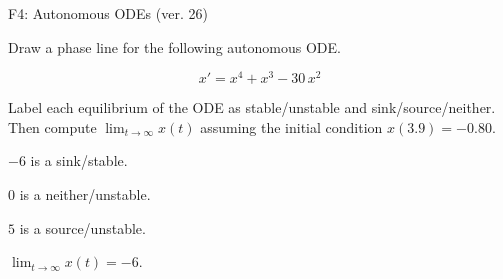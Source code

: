 \begin{exercise}
  \begin{exerciseTitle}F4: Autonomous ODEs (ver. 26)\end{exerciseTitle}
  \begin{exerciseStatement}
    

      Draw a phase line for the following 
      autonomous ODE.
    

    
\[x'= x^{4} + x^{3} - 30 \, x^{2}\]

    

      Label each equilibrium of the ODE
      as stable/unstable and sink/source/neither.
      Then compute \(\lim_{t\to\infty}x(t)\)
      assuming the initial condition
      \(x( 3.9 )= -0.80\).
    

  \end{exerciseStatement}
  \begin{exerciseAnswer}
    

      \(-6\) is a sink/stable.
      
        \(0\) is a neither/unstable.
      
      \(5\) is a source/unstable.
    

    

      \(\lim_{t\to\infty}x(t)=-6\).
    

  \end{exerciseAnswer}
\end{exercise}